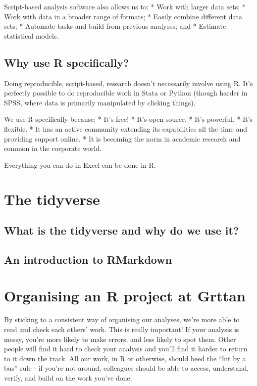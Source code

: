 \documentclass[]{book}
\begin{document}
Script-based analysis software also allows us to:
* Work with larger data sets;
* Work with data in a broader range of formats;
* Easily combine different data sets;
* Automate tasks and build from previous analyses; and
* Estimate statistical models.

\hypertarget{why-R}{%
\section{Why use R specifically?}\label{why-R}}

Doing reproducible, script-based, research doesn't necessarily involve using R. It's perfectly possible to do reproducible work in Stata or Python (though harder in SPSS, where data is primarily manipulated by clicking things).

We use R specifically because:
* It's free!
* It's open source.
* It's powerful.
* It's flexible.
* It has an active community extending its capabilities all the time and providing support online.
* It is becoming the norm in academic research and common in the corporate world.

Everything you can do in Excel can be done in R.

\hypertarget{the-tidyverse}{%
\chapter{The tidyverse}\label{the-tidyverse}}

\hypertarget{what-is-the-tidyverse-and-why-do-we-use-it}{%
\section{What is the tidyverse and why do we use it?}\label{what-is-the-tidyverse-and-why-do-we-use-it}}

\hypertarget{an-introduction-to-rmarkdown}{%
\section{An introduction to RMarkdown}\label{an-introduction-to-rmarkdown}}

\hypertarget{organising-an-r-project-at-grttan}{%
\chapter{Organising an R project at Grttan}\label{organising-an-r-project-at-grttan}}

By sticking to a consistent way of organising our analyses, we're more able to read and check each others' work. This is really important! If your analysis is messy, you're more likely to make errors, and less likely to spot them. Other people will find it hard to check your analysis and you'll find it harder to return to it down the track. All our work, in R or otherwise, should heed the ``hit by a bus'' rule - if you're not around, colleagues should be able to access, understand, verify, and build on the work you've done.
\end{document}
